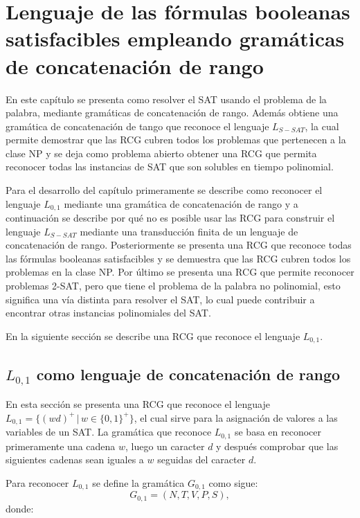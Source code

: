 \chapter{Lenguaje de las fórmulas booleanas satisfacibles empleando gramáticas de concatenación de rango}
\label{chap:LSATRCG}


En este capítulo se presenta como resolver el SAT usando el problema de la palabra, mediante gramáticas de concatenación
de rango. Además obtiene una gramática de concatenación de tango que reconoce el lenguaje $L_{S-SAT}$, la cual permite demostrar
que las RCG cubren todos los problemas que pertenecen a la clase NP y se deja como problema abierto
obtener una RCG que permita reconocer todas las instancias de SAT que son solubles en tiempo polinomial.

Para el desarrollo del capítulo primeramente se describe como reconocer el lenguaje $L_{0,1}$ mediante
una gramática de concatenación de rango y a continuación se describe por qué no es posible usar las RCG
para construir el lenguaje $L_{S-SAT}$ mediante una transducción finita de un lenguaje de concatenación de rango.
Posteriormente se presenta una RCG que reconoce todas las fórmulas booleanas satisfacibles y se demuestra que
las RCG cubren todos los problemas en la clase NP. Por último se presenta una RCG que permite reconocer
problemas 2-SAT, pero que tiene el problema de la palabra no polinomial, esto significa una vía distinta
para resolver el SAT, lo cual puede contribuir a encontrar otras instancias polinomiales del SAT.

En la siguiente sección se describe una RCG que reconoce el lenguaje $L_{0,1}$.

\section{$L_{0,1}$ como lenguaje de concatenación de rango}

En esta sección se presenta una RCG que reconoce el lenguaje $L_{0,1}=\{(wd)^+\,|\,w\in\{0,1\}^+\}$,
el cual sirve para la asignación de valores a las variables de un SAT. La gramática que reconoce $L_{0,1}$
se basa en reconocer primeramente una cadena $w$, luego un caracter $d$ y después comprobar que las siguientes
cadenas sean iguales a $w$ seguidas del caracter $d$.

Para reconocer $L_{0,1}$ se define la gramática $G_{0,1}$ como sigue:
\[
    G_{0,1} = (N, T, V, P, S),
\]
donde:

